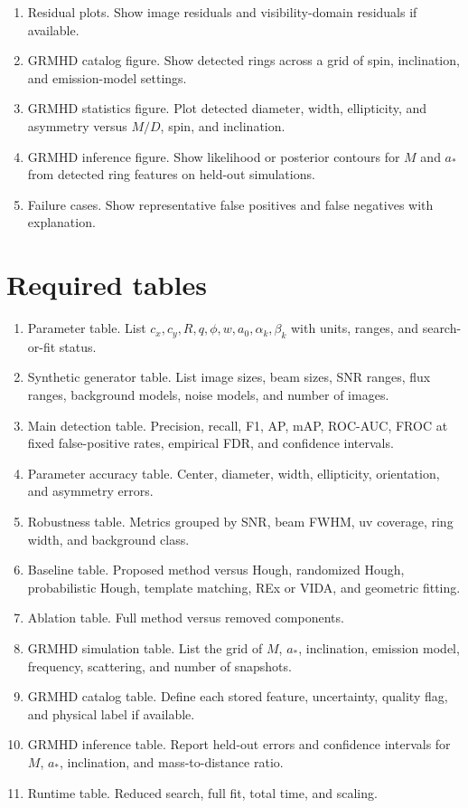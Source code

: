 \documentclass[11pt]{article}
\begin{document}
\begin{enumerate}[leftmargin=*]
    \item Residual plots. Show image residuals and visibility-domain residuals if available.
    \item GRMHD catalog figure. Show detected rings across a grid of spin, inclination, and emission-model settings.
    \item GRMHD statistics figure. Plot detected diameter, width, ellipticity, and asymmetry versus $M/D$, spin, and inclination.
    \item GRMHD inference figure. Show likelihood or posterior contours for $M$ and $a_*$ from detected ring features on held-out simulations.
    \item Failure cases. Show representative false positives and false negatives with explanation.
\end{enumerate}

\section{Required tables}

\begin{enumerate}[leftmargin=*]
    \item Parameter table. List $c_x,c_y,R,q,\phi,w,a_0,\alpha_k,\beta_k$ with units, ranges, and search-or-fit status.
    \item Synthetic generator table. List image sizes, beam sizes, SNR ranges, flux ranges, background models, noise models, and number of images.
    \item Main detection table. Precision, recall, F1, AP, mAP, ROC-AUC, FROC at fixed false-positive rates, empirical FDR, and confidence intervals.
    \item Parameter accuracy table. Center, diameter, width, ellipticity, orientation, and asymmetry errors.
    \item Robustness table. Metrics grouped by SNR, beam FWHM, uv coverage, ring width, and background class.
    \item Baseline table. Proposed method versus Hough, randomized Hough, probabilistic Hough, template matching, REx or VIDA, and geometric fitting.
    \item Ablation table. Full method versus removed components.
    \item GRMHD simulation table. List the grid of $M$, $a_*$, inclination, emission model, frequency, scattering, and number of snapshots.
    \item GRMHD catalog table. Define each stored feature, uncertainty, quality flag, and physical label if available.
    \item GRMHD inference table. Report held-out errors and confidence intervals for $M$, $a_*$, inclination, and mass-to-distance ratio.
    \item Runtime table. Reduced search, full fit, total time, and scaling.
\end{enumerate}
\end{document}
